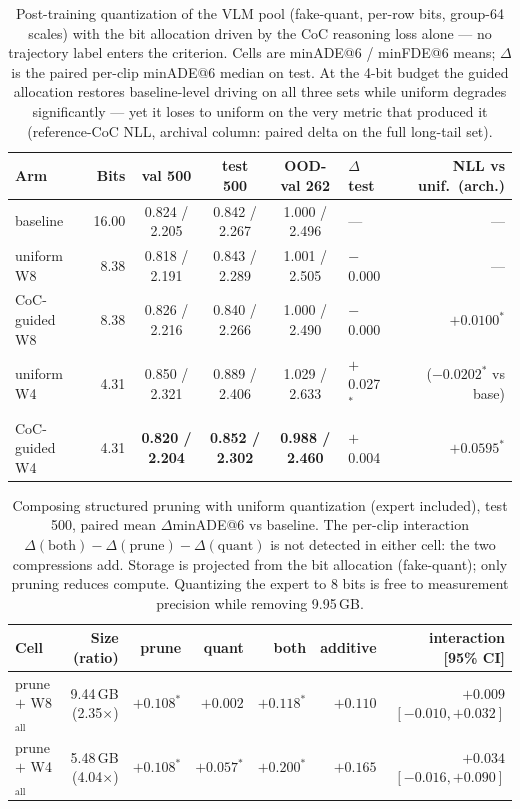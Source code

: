 \begin{table}[t]
\centering
\small
\setlength{\tabcolsep}{3.5pt}
\caption{%
  Post-training quantization of the VLM pool (fake-quant, per-row bits, group-64
  scales) with the bit allocation driven by the CoC reasoning loss alone --- no
  trajectory label enters the criterion. Cells are minADE@6 / minFDE@6 means;
  $\Delta$ is the paired per-clip minADE@6 median on test. At the 4-bit budget the
  guided allocation restores baseline-level driving on all three sets while uniform
  degrades significantly --- yet it loses to uniform on the very metric that produced
  it (reference-CoC NLL, archival column: paired delta on the full long-tail set).
}
\label{tab:quant}
\begin{tabular}{lrccclr}
\toprule
Arm & Bits & val 500 & test 500 & OOD-val 262 & $\Delta$ test & NLL vs unif.\ (arch.) \\
\midrule
baseline      & 16.00 & 0.824 / 2.205 & 0.842 / 2.267 & 1.000 / 2.496 & --- & --- \\
uniform W8    & 8.38  & 0.818 / 2.191 & 0.843 / 2.289 & 1.001 / 2.505 & $-$0.000 & --- \\
CoC-guided W8 & 8.38  & 0.826 / 2.216 & 0.840 / 2.266 & 1.000 / 2.490 & $-$0.000 & $+0.0100^{*}$ \\
uniform W4    & 4.31  & 0.850 / 2.321 & 0.889 / 2.406 & 1.029 / 2.633 & $+$0.027$^*$ & ($-0.0202^{*}$ vs base) \\
CoC-guided W4 & 4.31  & \textbf{0.820 / 2.204} & \textbf{0.852 / 2.302} & \textbf{0.988 / 2.460} & $+$0.004 & $+0.0595^{*}$ \\
\bottomrule
\end{tabular}
\end{table}

\begin{table}[t]
\centering
\small
\setlength{\tabcolsep}{4.5pt}
\caption{%
  Composing structured pruning with uniform quantization (expert included), test 500,
  paired mean $\Delta$minADE@6 vs baseline. The per-clip interaction
  $\Delta(\mathrm{both}) - \Delta(\mathrm{prune}) - \Delta(\mathrm{quant})$ is not
  detected in either cell: the two compressions add. Storage is projected from the
  bit allocation (fake-quant); only pruning reduces compute. Quantizing the expert
  to 8 bits is free to measurement precision while removing 9.95\,GB.
}
\label{tab:composition}
\begin{tabular}{lrrrrrr}
\toprule
Cell & Size (ratio) & prune & quant & both & additive & interaction [95\% CI] \\
\midrule
prune $+$ W8$_\mathrm{all}$ & 9.44\,GB (2.35$\times$) & $+0.108^*$ & $+0.002$ & $+0.118^*$ & $+0.110$ & $+0.009$ $[-0.010, +0.032]$ \\
prune $+$ W4$_\mathrm{all}$ & 5.48\,GB (4.04$\times$) & $+0.108^*$ & $+0.057^*$ & $+0.200^*$ & $+0.165$ & $+0.034$ $[-0.016, +0.090]$ \\
\bottomrule
\end{tabular}
\end{table}

